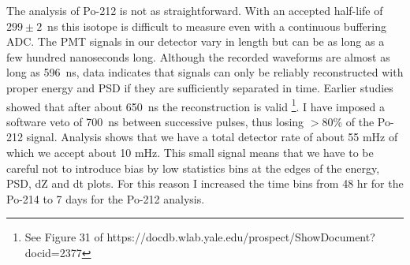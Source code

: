 The analysis of Po-212 is not as straightforward. With an accepted half-life of $299\pm2$~ns this isotope is difficult to measure even with a continuous buffering ADC. The PMT signals in our detector vary in length but can be as long as a few hundred nanoseconds long. Although the recorded waveforms are almost as long as 596~ns, data indicates that signals can only be reliably reconstructed with proper energy and PSD if they are sufficiently separated in time. Earlier studies showed that after about 650~ns the reconstruction is valid \footnote{See Figure 31 of https://docdb.wlab.yale.edu/prospect/ShowDocument?docid=2377}. I have imposed a software veto of 700~ns between successive pulses, thus losing $>$80\% of the Po-212 signal. Analysis shows that we have a total detector rate of about 55 mHz of which we accept about 10 mHz. This small signal means that we have to be careful not to introduce bias by low statistics bins at the edges of the energy, PSD, dZ and dt plots. For this reason I increased the time bins from 48 hr for the Po-214 to 7 days for the Po-212 analysis. 

